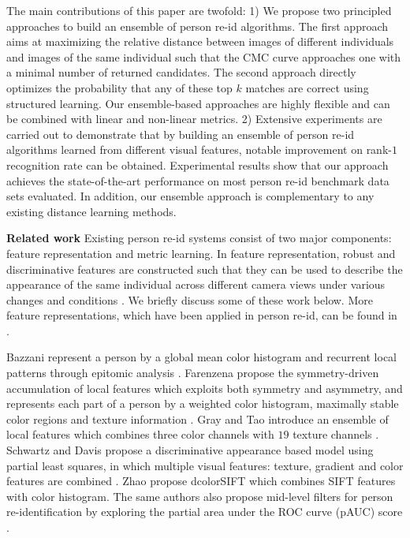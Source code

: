 \documentclass[10pt,twocolumn,letterpaper]{article}
\renewcommand{\paragraph}{\textbf}
\begin{document}
The main contributions of this paper are twofold:
1)
We propose two principled approaches to build an ensemble of
person re-id algorithms.
The first approach aims at
maximizing the relative distance between images of
different individuals and images of the same individual
such that the CMC curve approaches one with a minimal
number of returned candidates.
The second approach directly optimizes the
probability that any of these top $k$ matches
are correct using structured learning.
Our ensemble-based approaches are highly flexible and can be combined with linear
and non-linear metrics.
2)
Extensive experiments are carried out to demonstrate that by building
an ensemble of person re-id algorithms learned from different
visual features, notable improvement on rank-$1$
recognition rate can be obtained.
Experimental results show that
our approach achieves the state-of-the-art performance on most person
re-id benchmark data sets evaluated.
In addition, our ensemble approach is complementary to any existing distance learning methods.







\paragraph{Related work}
%
Existing person re-id systems consist of two major
components: feature representation and metric learning.
In feature representation, robust and discriminative features are
constructed such that they can be used to describe the appearance
of the same individual across different camera views
under various changes and conditions \cite{Bazzani2012Multiple,
Cheng2011Custom,Farenzena2010Person,
Gheissari2006Person,Gray2008Viewpoint,
Wang2007Shape,Zhao2013Unsupervised,Zhao2014Learning}.
We briefly discuss some of these work below.
More feature representations, which have been
applied in person re-id,
can be found in \cite{Gong2013Person}.

Bazzani \etal represent a person by a global mean
color histogram and recurrent local patterns
through epitomic analysis \cite{Bazzani2012Multiple}.
%
%
%
Farenzena \etal propose the symmetry-driven accumulation
of local features which exploits both symmetry and asymmetry,
and represents each part of a person by a weighted color histogram,
maximally stable color regions and texture information \cite{Farenzena2010Person}.
Gray and Tao introduce an ensemble of local features which combines
three color channels with $19$ texture channels \cite{Gray2008Viewpoint}.
Schwartz and Davis propose a discriminative appearance based model using partial least squares,
in which multiple visual features: texture, gradient and color features
are combined \cite{Schwartz2009Learning}.
Zhao \etal propose dcolorSIFT which combines SIFT features with color histogram.
%
%
%
The same authors also propose mid-level filters for person re-identification
by exploring the partial area under the ROC curve (pAUC) score \cite{Zhao2014Learning}.
\end{document}
